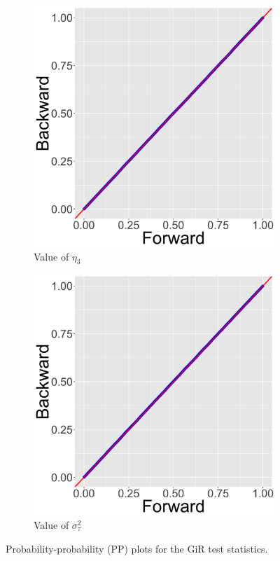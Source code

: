\documentclass[ba]{imsart}
\numberwithin{equation}{section}
\theoremstyle{plain}
\begin{document}
\begin{figure}[!t]
\begin{subfigure}[b]{0.2425\textwidth}
			\end{subfigure}   	   		   	   	
			\begin{subfigure}[b]{0.2425\textwidth}
				\caption{Value of $\eta_3$}
				\includegraphics[width=\textwidth]{img/plot11.png}	
			\end{subfigure}   	   		   	   	  		   	   	 	
			\begin{subfigure}[b]{0.2425\textwidth}
				\caption{Value of $\sigma^2_\tau$}
				\includegraphics[width=\textwidth]{img/plot12.png}	
			\end{subfigure}   	   		   	   	   	   		   	   	   		   	   	
			\caption{Probability-probability (PP) plots for the GiR test statistics.}
			\label{figure:GiRplot}
		\end{figure}   
\end{document}
